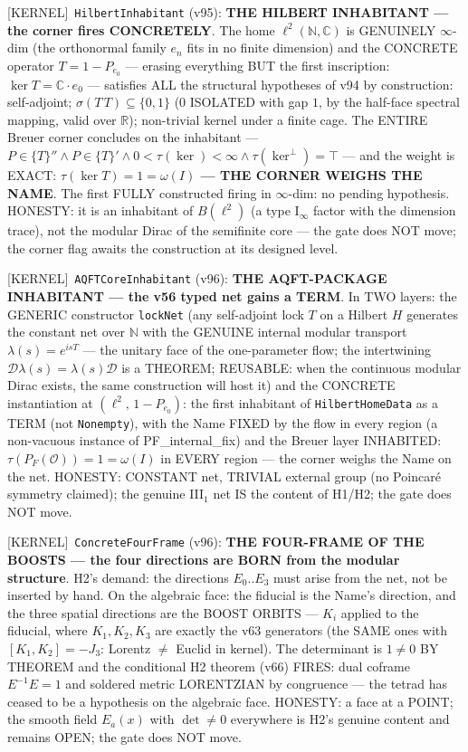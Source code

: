 \documentclass[11pt]{article}
\providecommand{\kernelmk}[1]{\textsf{[KERNEL]}~\texttt{#1}}\providecommand{\knownmk}[1]{\textsf{[KNOWN]}~{#1}}\providecommand{\statusmk}[1]{\textsf{[#1]}}
\theoremstyle{definition}\newtheorem{deriv}{Derivation}
\begin{document}
\kernelmk{HilbertInhabitant} (v95): \textbf{THE HILBERT INHABITANT --- the corner fires CONCRETELY}. The home $\ell^2(\mathbb N,\mathbb C)$ is GENUINELY $\infty$-dim (the orthonormal family $e_n$ fits in no finite dimension) and the CONCRETE operator $T=1-P_{e_0}$ --- erasing everything BUT the first inscription: $\ker T=\mathbb C\cdot e_0$ --- satisfies ALL the structural hypotheses of v94 by construction: self-adjoint; $\sigma(T\,T)\subseteq\{0,1\}$ ($0$ ISOLATED with gap $1$, by the half-face spectral mapping, valid over $\mathbb R$); non-trivial kernel under a finite cage. The ENTIRE Breuer corner concludes on the inhabitant --- $P\in\{T\}''\wedge P\in\{T\}'\wedge 0<\tau(\ker)<\infty\wedge\tau(\ker^\perp)=\top$ --- and the weight is EXACT: \textbf{$\tau(\ker T)=1=\omega(I)$ --- THE CORNER WEIGHS THE NAME}. The first FULLY constructed firing in $\infty$-dim: no pending hypothesis. HONESTY: it is an inhabitant of $B(\ell^2)$ (a type I$_\infty$ factor with the dimension trace), not the modular Dirac of the semifinite core --- the gate does NOT move; the corner flag awaits the construction at its designed level.

\kernelmk{AQFTCoreInhabitant} (v96): \textbf{THE AQFT-PACKAGE INHABITANT --- the v56 typed net gains a TERM}. In TWO layers: the GENERIC constructor \texttt{lockNet} (any self-adjoint lock $T$ on a Hilbert $H$ generates the constant net over $\mathbb N$ with the GENUINE internal modular transport $\lambda(s)=e^{isT}$ --- the unitary face of the one-parameter flow; the intertwining $\mathcal D\lambda(s)=\lambda(s)\mathcal D$ is a THEOREM; REUSABLE: when the continuous modular Dirac exists, the same construction will host it) and the CONCRETE instantiation at $(\ell^2,\,1-P_{e_0})$: the first inhabitant of \texttt{HilbertHomeData} as a TERM (not \texttt{Nonempty}), with the Name FIXED by the flow in every region (a non-vacuous instance of PF\_internal\_fix) and the Breuer layer INHABITED: $\tau(P_F(\mathcal O))=1=\omega(I)$ in EVERY region --- the corner weighs the Name on the net. HONESTY: CONSTANT net, TRIVIAL external group (no Poincaré symmetry claimed); the genuine III$_1$ net IS the content of H1/H2; the gate does NOT move.

\kernelmk{ConcreteFourFrame} (v96): \textbf{THE FOUR-FRAME OF THE BOOSTS --- the four directions are BORN from the modular structure}. H2's demand: the directions $E_0..E_3$ must arise from the net, not be inserted by hand. On the algebraic face: the fiducial is the Name's direction, and the three spatial directions are the BOOST ORBITS --- $K_i$ applied to the fiducial, where $K_1,K_2,K_3$ are exactly the v63 generators (the SAME ones with $[K_1,K_2]=-J_3$: Lorentz $\neq$ Euclid in kernel). The determinant is $1\neq0$ BY THEOREM and the conditional H2 theorem (v66) FIRES: dual coframe $E^{-1}E=1$ and soldered metric LORENTZIAN by congruence --- the tetrad has ceased to be a hypothesis on the algebraic face. HONESTY: a face at a POINT; the smooth field $E_a(x)$ with $\det\neq0$ everywhere is H2's genuine content and remains OPEN; the gate does NOT move.
\end{document}

